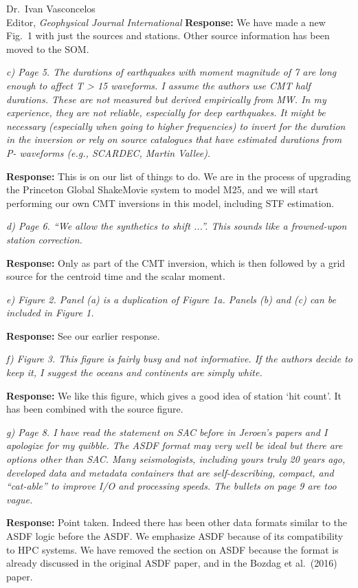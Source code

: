\documentclass[11pt,a4paper]{letter}
\newcommand{\response}[1]{\textbf{Response:} #1}
\newcommand{\rev}[1]{{\it{#1}}}
\begin{document}
\begin{letter}{Dr.~Ivan Vasconcelos\\
Editor, \textit{Geophysical Journal International}}
\response{We have made a new Fig.~1 with just the sources and stations. Other source information has been moved to the SOM.}

\rev{c) Page 5. The durations of earthquakes with moment magnitude of 7 are long enough to affect T > 15 waveforms. I assume the authors use CMT half durations. These are not measured but derived empirically from MW. In my experience, they are not reliable, especially for deep earthquakes. It might be necessary (especially when going to higher frequencies) to invert for the duration in the inversion or rely on source catalogues that have estimated durations from P- waveforms (e.g., SCARDEC, Martin Vallee).
}

\response{This is on our list of things to do. We are in the process of upgrading the Princeton Global ShakeMovie system to model M25, and we will start performing our own CMT inversions in this model, including STF estimation.}

\rev{d) Page 6. ``We allow the synthetics to shift ...''. This sounds like a frowned-upon station correction.
}

\response{Only as part of the CMT inversion, which is then followed by a grid source for the centroid time and the scalar moment.}

\rev{e) Figure 2. Panel (a) is a duplication of Figure 1a. Panels (b) and (c) can be included in Figure 1.
}

\response{See our earlier response.}

\rev{f) Figure 3. This figure is fairly busy and not informative. If the authors decide to keep it, I suggest the oceans and continents are simply white.
}

\response{We like this figure, which gives a good idea of station `hit count'. It has been combined with the source figure.
}

\rev{g) Page 8. I have read the statement on SAC before in Jeroen's papers and I apologize for my quibble. The ASDF format may very well be ideal but there are options other than SAC. Many seismologists, including yours truly 20 years ago, developed data and metadata containers that are self-describing, compact, and ``cat-able'' to improve I/O and processing speeds. The bullets on page 9 are too vague.
}

\response{Point taken.  Indeed there has been other data formats similar to the ASDF logic before the ASDF. We emphasize ASDF because of its compatibility to HPC systems. We have removed the section on ASDF because the format is already discussed in the original ASDF paper, and in the Bozdag et al.~(2016) paper.}


\end{letter}
\end{document}
